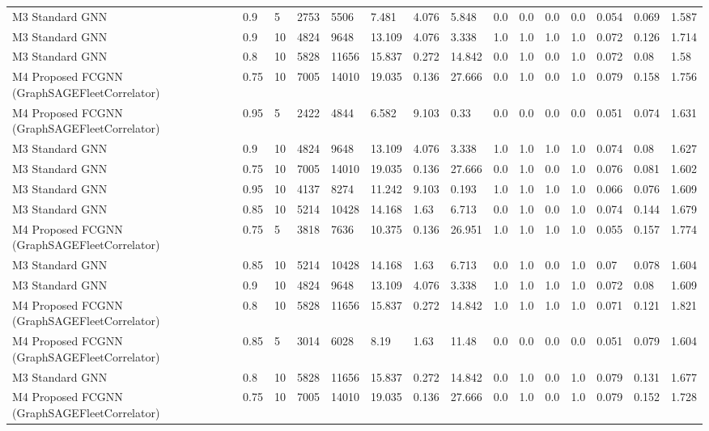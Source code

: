\begin{table}[t]
\begin{tabular}{lllllllllllllll}
M3 Standard GNN & 0.9 & 5 & 2753 & 5506 & 7.481 & 4.076 & 5.848 & 0.0 & 0.0 & 0.0 & 0.0 & 0.054 & 0.069 & 1.587 \\
M3 Standard GNN & 0.9 & 10 & 4824 & 9648 & 13.109 & 4.076 & 3.338 & 1.0 & 1.0 & 1.0 & 1.0 & 0.072 & 0.126 & 1.714 \\
M3 Standard GNN & 0.8 & 10 & 5828 & 11656 & 15.837 & 0.272 & 14.842 & 0.0 & 1.0 & 0.0 & 1.0 & 0.072 & 0.08 & 1.58 \\
M4 Proposed FCGNN (GraphSAGEFleetCorrelator) & 0.75 & 10 & 7005 & 14010 & 19.035 & 0.136 & 27.666 & 0.0 & 1.0 & 0.0 & 1.0 & 0.079 & 0.158 & 1.756 \\
M4 Proposed FCGNN (GraphSAGEFleetCorrelator) & 0.95 & 5 & 2422 & 4844 & 6.582 & 9.103 & 0.33 & 0.0 & 0.0 & 0.0 & 0.0 & 0.051 & 0.074 & 1.631 \\
M3 Standard GNN & 0.9 & 10 & 4824 & 9648 & 13.109 & 4.076 & 3.338 & 1.0 & 1.0 & 1.0 & 1.0 & 0.074 & 0.08 & 1.627 \\
M3 Standard GNN & 0.75 & 10 & 7005 & 14010 & 19.035 & 0.136 & 27.666 & 0.0 & 1.0 & 0.0 & 1.0 & 0.076 & 0.081 & 1.602 \\
M3 Standard GNN & 0.95 & 10 & 4137 & 8274 & 11.242 & 9.103 & 0.193 & 1.0 & 1.0 & 1.0 & 1.0 & 0.066 & 0.076 & 1.609 \\
M3 Standard GNN & 0.85 & 10 & 5214 & 10428 & 14.168 & 1.63 & 6.713 & 0.0 & 1.0 & 0.0 & 1.0 & 0.074 & 0.144 & 1.679 \\
M4 Proposed FCGNN (GraphSAGEFleetCorrelator) & 0.75 & 5 & 3818 & 7636 & 10.375 & 0.136 & 26.951 & 1.0 & 1.0 & 1.0 & 1.0 & 0.055 & 0.157 & 1.774 \\
M3 Standard GNN & 0.85 & 10 & 5214 & 10428 & 14.168 & 1.63 & 6.713 & 0.0 & 1.0 & 0.0 & 1.0 & 0.07 & 0.078 & 1.604 \\
M3 Standard GNN & 0.9 & 10 & 4824 & 9648 & 13.109 & 4.076 & 3.338 & 1.0 & 1.0 & 1.0 & 1.0 & 0.072 & 0.08 & 1.609 \\
M4 Proposed FCGNN (GraphSAGEFleetCorrelator) & 0.8 & 10 & 5828 & 11656 & 15.837 & 0.272 & 14.842 & 1.0 & 1.0 & 1.0 & 1.0 & 0.071 & 0.121 & 1.821 \\
M4 Proposed FCGNN (GraphSAGEFleetCorrelator) & 0.85 & 5 & 3014 & 6028 & 8.19 & 1.63 & 11.48 & 0.0 & 0.0 & 0.0 & 0.0 & 0.051 & 0.079 & 1.604 \\
M3 Standard GNN & 0.8 & 10 & 5828 & 11656 & 15.837 & 0.272 & 14.842 & 0.0 & 1.0 & 0.0 & 1.0 & 0.079 & 0.131 & 1.677 \\
M4 Proposed FCGNN (GraphSAGEFleetCorrelator) & 0.75 & 10 & 7005 & 14010 & 19.035 & 0.136 & 27.666 & 0.0 & 1.0 & 0.0 & 1.0 & 0.079 & 0.152 & 1.728 \\

\end{tabular}
\end{table}
